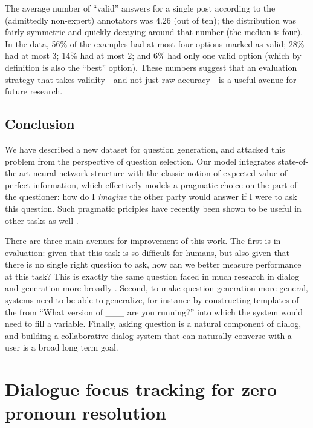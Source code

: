 \documentclass[11pt]{report}
\begin{document}
The average number of ``valid'' answers for a single post according to the (admittedly non-expert) annotators was 4.26 (out of ten); the distribution was fairly symmetric and quickly decaying around that number (the median is four).
In the data, 56\% of the examples had at most four options marked as valid; 
28\% had at most 3; 14\% had at most 2; and 6\% had only one valid option (which by definition is also the ``best'' option).
These numbers suggest that an evaluation strategy that takes validity---and not just raw accuracy---is a useful avenue for future research.

\section{Conclusion}

We have described a new dataset for question generation, and attacked this problem from the perspective of question selection.
Our model integrates state-of-the-art neural network structure with the classic notion of expected value of perfect information, which effectively models a pragmatic choice on the part of the questioner: how do I \emph{imagine} the other party would answer if I were to ask this question. Such pragmatic priciples have recently been shown to be useful in other tasks as well \cite{golland2010game,smith2013learning,orita2015discourse,andreas2016reasoning}.

There are three main avenues for improvement of this work.
The first is in evaluation: given that this task is so difficult for humans, but also given that there is no single right question to ask, how can we better measure performance at this task?
This is exactly the same question faced in much research in dialog and generation more broadly \cite{paek2001empirical,lowe2015ubuntu,liu2016not,kannan2017adversarial}.
Second, to make question generation more general, systems need to be able to generalize, for instance by constructing templates of the from ``What version of \_\_\_ are you running?'' into which the system would need to fill a variable. Finally, asking question is a natural component of dialog, and building a collaborative dialog system that can naturally converse with a user is a broad long term goal.

\newpage

\chapter{Dialogue focus tracking for zero pronoun resolution}
\end{document}
